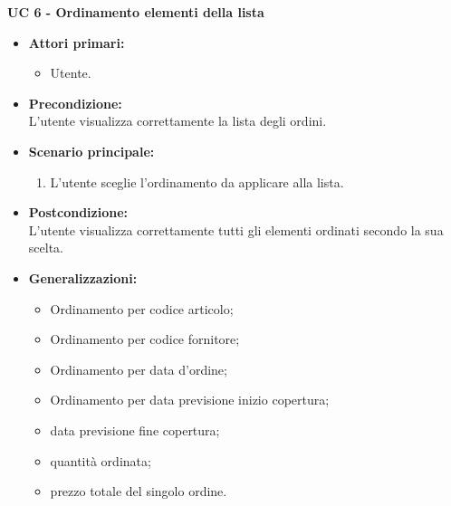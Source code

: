 \noindent \textbf{\large UC 6 - Ordinamento elementi della lista}
\label{uc:ordinamento-elementi-lista}
\begin{itemize}

	\item \textbf{Attori primari: }
		\begin{itemize}
			\item Utente.
		\end{itemize}

	\item \textbf{Precondizione: }\\[0.3cm]
		L'utente visualizza correttamente la lista degli ordini.

	\item \textbf{Scenario principale: }
		\begin{enumerate}
			\item L'utente sceglie l'ordinamento da applicare alla lista.
		\end{enumerate}
		

	\item \textbf{Postcondizione: }\\[0.3cm]
		L'utente visualizza correttamente tutti gli elementi ordinati secondo la sua scelta.
    
    \item \textbf{Generalizzazioni: }
        \begin{itemize}
            \item Ordinamento per codice articolo;
            \item Ordinamento per codice fornitore;
            \item Ordinamento per data d'ordine;
            \item Ordinamento per data previsione inizio copertura;
            \item data previsione fine copertura;
            \item quantità ordinata;
            \item prezzo totale del singolo ordine.
        \end{itemize}
\end{itemize}

\vspace{0.5cm}

